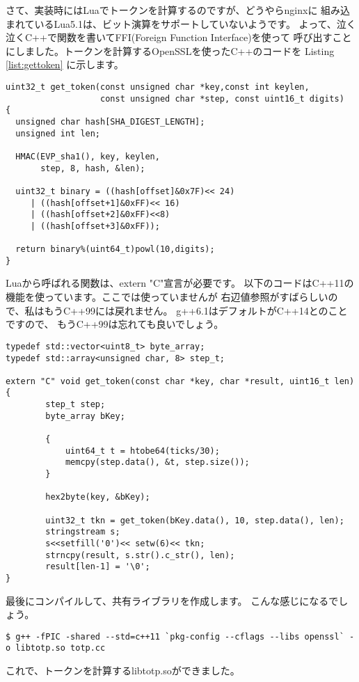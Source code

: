 さて、実装時にはLuaでトークンを計算するのですが、どうやらnginxに
組み込まれているLua5.1は、ビット演算をサポートしていないようです。
よって、泣く泣くC++で関数を書いてFFI(Foreign Function Interface)を使って
呼び出すことにしました。トークンを計算するOpenSSLを使ったC++のコードを
Listing \ref{list:gettoken} に示します。

\begin{lstlisting}[caption=トークンの計算(C++),label=list:gettoken]
uint32_t get_token(const unsigned char *key,const int keylen, 
             	   const unsigned char *step, const uint16_t digits)
{
  unsigned char hash[SHA_DIGEST_LENGTH];
  unsigned int len;

  HMAC(EVP_sha1(), key, keylen, 
       step, 8, hash, &len);

  uint32_t binary = ((hash[offset]&0x7F)<< 24)
     | ((hash[offset+1]&0xFF)<< 16)
     | ((hash[offset+2]&0xFF)<<8)
     | ((hash[offset+3]&0xFF));

  return binary%(uint64_t)powl(10,digits);
}
\end{lstlisting}

Luaから呼ばれる関数は、extern "C"宣言が必要です。
以下のコードはC++11の機能を使っています。ここでは使っていませんが
右辺値参照がすばらしいので、私はもうC++99には戻れません。
g++6.1はデフォルトがC++14とのことですので、
もうC++99は忘れても良いでしょう。

\begin{lstlisting}[caption=呼び出し用の関数,label=list:caller]
typedef std::vector<uint8_t> byte_array;
typedef std::array<unsigned char, 8> step_t;

extern "C" void get_token(const char *key, char *result, uint16_t len)
{
        step_t step;
        byte_array bKey;
        
		{
        	uint64_t t = htobe64(ticks/30);
        	memcpy(step.data(), &t, step.size());
		}

        hex2byte(key, &bKey);

        uint32_t tkn = get_token(bKey.data(), 10, step.data(), len);
        stringstream s;
        s<<setfill('0')<< setw(6)<< tkn;
        strncpy(result, s.str().c_str(), len);
        result[len-1] = '\0';
}
\end{lstlisting}

最後にコンパイルして、共有ライブラリを作成します。
こんな感じになるでしょう。

\begin{lstlisting}[caption=共有ライブラリの作成,label=list:sharedlib]
$ g++ -fPIC -shared --std=c++11 `pkg-config --cflags --libs openssl` -o libtotp.so totp.cc
\end{lstlisting}
これで、トークンを計算するlibtotp.soができました。
